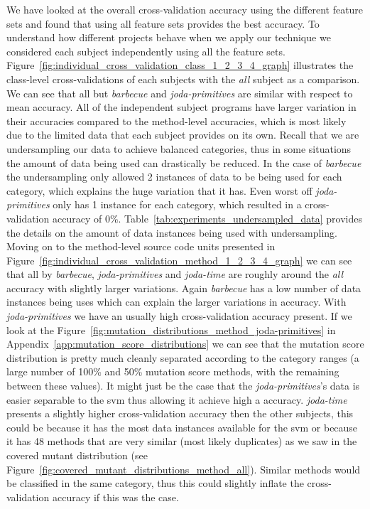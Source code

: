 We have looked at the overall cross-validation accuracy using the different feature sets and found that using all feature sets provides the best accuracy. To understand how different projects behave when we apply our technique we considered each subject independently using all the feature sets. Figure~\ref{fig:individual_cross_validation_class_1_2_3_4_graph} illustrates the class-level cross-validations of each subjects with the \emph{all} subject as a comparison. We can see that all but \emph{barbecue} and \emph{joda-primitives} are similar with respect to mean accuracy. All of the independent subject programs have larger variation in their accuracies compared to the method-level accuracies, which is most likely due to the limited data that each subject provides on its own. Recall that we are undersampling our data to achieve balanced categories, thus in some situations the amount of data being used can drastically be reduced. In the case of \emph{barbecue} the undersampling only allowed 2 instances of data to be being used for each category, which explains the huge variation that it has. Even worst off \emph{joda-primitives} only has 1 instance for each category, which resulted in a cross-validation accuracy of 0\%. Table~\ref{tab:experiments_undersampled_data} provides the details on the amount of data instances being used with undersampling. Moving on to the method-level source code units presented in Figure~\ref{fig:individual_cross_validation_method_1_2_3_4_graph} we can see that all by \emph{barbecue}, \emph{joda-primitives} and \emph{joda-time} are roughly around the \emph{all} accuracy with slightly larger variations. Again \emph{barbecue} has a low number of data instances being uses which can explain the larger variations in accuracy. With \emph{joda-primitives} we have an usually high cross-validation accuracy present. If we look at the Figure~\ref{fig:mutation_distributions_method_joda-primitives} in Appendix~\ref{app:mutation_score_distributions} we can see that the mutation score distribution is pretty much cleanly separated according to the category ranges (a large number of 100\% and 50\% mutation score methods, with the remaining between these values). It might just be the case that the \emph{joda-primitives}'s data is easier separable to the \gls{svm} thus allowing it achieve high a accuracy. \emph{joda-time} presents a slightly higher cross-validation accuracy then the other subjects, this could be because it has the most data instances available for the \gls{svm} or because it has 48 methods that are very similar (most likely duplicates) as we saw in the covered mutant distribution (see Figure~\ref{fig:covered_mutant_distributions_method_all}). Similar methods would be classified in the same category, thus this could slightly inflate the cross-validation accuracy if this was the case.


